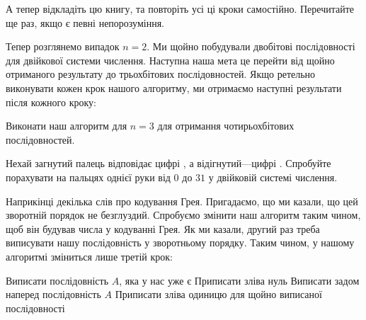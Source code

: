 \begin{exercise}
А тепер відкладіть цю книгу, та повторіть усі ці кроки самостійно. Перечитайте ще раз, якщо є певні непорозуміння.
\end{exercise}

Тепер розглянемо випадок $n=2$.
Ми щойно побудували двобітові послідовності для двійкової системи числення.
Наступна наша мета це перейти від щойно отриманого результату до трьохбітових послідовностей.
Якщо ретельно виконувати кожен крок нашого алгоритму, ми отримаємо наступні результати після кожного кроку:

\par{}\par
\par{}\par
\par{}\par
\par{}\par

\begin{exercise}
Виконати наш алгоритм для $n=3$ для отримання чотирьохбітових послідовностей.
\end{exercise}

\begin{exercise}
Нехай загнутий палець відповідає цифрі , а відігнутий---цифрі .
Спробуйте порахувати на пальцях однієї руки від $0$ до $31$ у двійковій системі числення.
\end{exercise}

Наприкінці декілька слів про кодування Грея.
Пригадаємо, що ми казали, що цей зворотній порядок не безглуздий.
Спробуємо змінити наш алгоритм таким чином, щоб він будував числа у кодуванні Грея.
Як ми казали, другий раз треба виписувати нашу послідовність у зворотньому порядку.
Таким чином, у нашому алгоритмі зміниться лише третій крок:

\begin{algorithm}
  \begin{algsteps}
    \algstep Виписати послідовність $A$, яка у нас уже є
    \algstep Приписати зліва нуль
    \algstep Виписати задом наперед послідовність $A$
    \algstep Приписати зліва одиницю для щойно виписаної послідовності
  \end{algsteps}
\end{algorithm}

